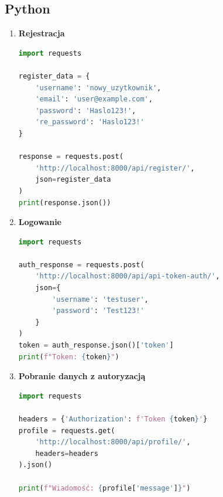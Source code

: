 \documentclass[a4paper,12pt]{article}
\begin{document}
\newpage

\subsection{Python}

\begin{enumerate}[label=\textbf{\textbullet}]

\item \textbf{Rejestracja}
\begin{lstlisting}[language=Python]
import requests

register_data = {
    'username': 'nowy_uzytkownik',
    'email': 'user@example.com',
    'password': 'Haslo123!',
    're_password': 'Haslo123!'
}

response = requests.post(
    'http://localhost:8000/api/register/', 
    json=register_data
)
print(response.json())
\end{lstlisting}

\item \textbf{Logowanie}
\begin{lstlisting}[language=Python]
import requests

auth_response = requests.post(
    'http://localhost:8000/api/api-token-auth/',
    json={
        'username': 'testuser', 
        'password': 'Test123!'
    }
)
token = auth_response.json()['token']
print(f"Token: {token}")
\end{lstlisting}

\item \textbf{Pobranie danych z autoryzacją}
\begin{lstlisting}[language=Python]
import requests

headers = {'Authorization': f'Token {token}'}
profile = requests.get(
    'http://localhost:8000/api/profile/', 
    headers=headers
).json()

print(f"Wiadomość: {profile['message']}")
\end{lstlisting}

\end{enumerate}
\end{document}
